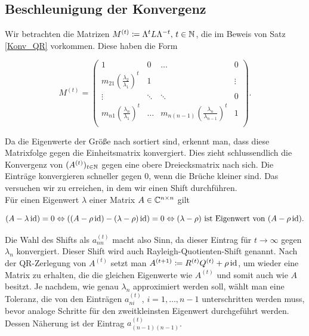 \documentclass{article}
\theoremstyle{plain}
\begin{document}
\subsection{Beschleunigung der Konvergenz}

Wir betrachten die Matrizen $M^{(t)} \coloneqq \Lambda^t L \Lambda^{-t},\, t \in \mathbb{N}$, die im Beweis von Satz \ref{Konv_QR} vorkommen. Diese haben die Form

\begin{equation*}
	M^{(t)} =
	\left( \begin{array}{cccc}
		1 & 0 & \dots & 0 \\
		m_{21} \left(\frac{\lambda_2}{\lambda_1}\right)^t & 1 &  &\vdots \\
		\vdots & \ddots & \ddots & 0 \\
		m_{n1} \left(\frac{\lambda_n}{\lambda_1}\right)^t & \dots & m_{n(n-1)} \left(\frac{\lambda_n}{\lambda_{n-1}}\right)^t & 1 \\
	\end{array}\right).
\end{equation*}

\vspace{4pt}
Da die Eigenwerte der Größe nach sortiert sind, erkennt man, dass diese Matrixfolge gegen die Einheitsmatrix konvergiert. Dies zieht schlussendlich die Konvergenz von $(A^{(t)})_{t\in \mathbb{N}}$ gegen eine obere Dreiecksmatrix nach sich.
Die Einträge konvergieren schneller gegen $0$, wenn die Brüche kleiner sind. Das versuchen wir zu erreichen, in dem wir einen Shift durchführen.\\
Für einen Eigenwert $\lambda$ einer Matrix $A \in \mathbb{C}^{n\times n}$ gilt

\begin{equation*}
	(A - \lambda \operatorname{id}) = 0 \Leftrightarrow ((A - \rho \operatorname{id}) - (\lambda -\rho) \operatorname{id}) = 0 \Leftrightarrow (\lambda-\rho) \text{ ist Eigenwert von }  (A - \rho \operatorname{id}).
\end{equation*}

Die Wahl des Shifts als $a^{(t)}_{nn}$ macht also Sinn, da dieser Eintrag für $t \rightarrow \infty$ gegen $\lambda_n$ konvergiert. Dieser Shift wird auch Rayleigh-Quotienten-Shift genannt. Nach der QR-Zerlegung von $A^{(t)}$ setzt man $A^{(t+1)} \coloneqq R^{(t)}Q^{(t)} + \rho \operatorname{id}$, um wieder eine Matrix zu erhalten, die die gleichen Eigenwerte wie $A^{(t)}$ und somit auch wie $A$ besitzt.
Je nachdem, wie genau $\lambda_n$ approximiert werden soll, wählt man eine Toleranz, die von den Einträgen $a^{(t)}_{ni}, \, i = 1,\dots, n-1$ unterschritten werden muss, bevor analoge Schritte für den zweitkleinsten Eigenwert durchgeführt werden. Dessen Näherung ist der Eintrag $a^{(t)}_{(n-1)(n-1)}$.
\end{document}
